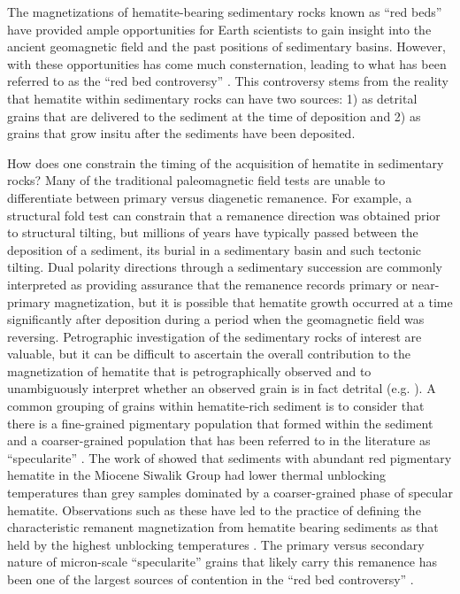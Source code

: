 \documentclass[11pt,letterpaper]{article}
\begin{document}
The magnetizations of hematite-bearing sedimentary rocks known as ``red beds'' have provided ample opportunities for Earth scientists to gain insight into the ancient geomagnetic field and the past positions of sedimentary basins. However, with these opportunities has come much consternation, leading to what has been referred to as the ``red bed controversy'' \citep{Butler1992a, Beck2003b, Van-Der-Voo2012a}. This controversy stems from the reality that hematite within sedimentary rocks can have two sources: 1) as detrital grains that are delivered to the sediment at the time of deposition and 2) as grains that grow insitu after the sediments have been deposited.

How does one constrain the timing of the acquisition of hematite in sedimentary rocks? Many of the traditional paleomagnetic field tests are unable to differentiate between primary versus diagenetic remanence. For example, a structural fold test can constrain that a remanence direction was obtained prior to structural tilting, but millions of years have typically passed between the deposition of a sediment, its burial in a sedimentary basin and such tectonic tilting. Dual polarity directions through a sedimentary succession are commonly interpreted as providing assurance that the remanence records primary or near-primary magnetization, but it is possible that hematite growth occurred at a time significantly after deposition during a period when the geomagnetic field was reversing. Petrographic investigation of the sedimentary rocks of interest are valuable, but it can be difficult to ascertain the overall contribution to the magnetization of hematite that is petrographically observed and to unambiguously interpret whether an observed grain is in fact detrital (e.g. \citealp{Elmore1982a}). A common grouping of grains within hematite-rich sediment is to consider that there is a fine-grained pigmentary population that formed within the sediment and a coarser-grained population that has been referred to in the literature as ``specularite'' \citep{Butler1992a, Van-Der-Voo2012a}. The work of \cite{Tauxe1980a} showed that sediments with abundant red pigmentary hematite in the Miocene Siwalik Group had lower thermal unblocking temperatures than grey samples dominated by a coarser-grained phase of specular hematite. Observations such as these have led to the practice of defining the characteristic remanent magnetization from hematite bearing sediments as that held by the highest unblocking temperatures \citep{Van-Der-Voo2012a}.  The primary versus secondary nature of micron-scale ``specularite'' grains that likely carry this remanence has been one of the largest sources of contention in the ``red bed controversy'' \citep{Van-Houten1968a, Tauxe1980a, Butler1992a, Van-Der-Voo2012a}.
\end{document}

